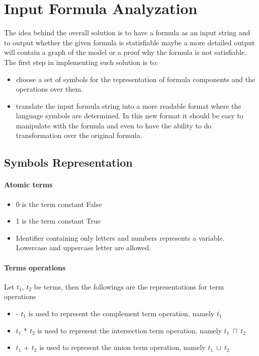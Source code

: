 \documentclass{article}
\begin{document}
	\section{Input Formula Analyzation}
		The idea behind the overall solution is to have a formula as an input string and to output whether the given formula is statisfiable maybe a more detailed output 
		will contain a graph of the model or a proof why the formula is not satisfiable.
		The first step in implementing such solution is to:
		\begin{itemize}
			\item choose a set of symbols for the representation of formula components and the operations over them.
			\item translate the input formula string into a more readable format where the language symbols are determined. In this new format 
				it should be easy to manipulate with the formula and even to have the ability to do transformation over the original formula.
		\end{itemize}

	\subsection{Symbols Representation}
		\paragraph{Atomic terms}
		\begin{itemize}
			\item 0 is the term constant False
			\item 1 is the term constant True
			\item Identifier containing only letters and numbers represents a variable. Lowercase and uppercase letter are allowed.
		\end{itemize}
		
		\paragraph{Terms operations}
		Let $t_1$, $t_2$ be terms, then the followings are the representations for term operations
		\begin{itemize}
			\item - $t_1$ is used to represent the complement term operation, namely $\overline{t_1}$
			\item $t_1$ * $t_2$ is used to represent the intersection term operation, namely $t_1 \: \sqcap \: t_2$
			\item $t_1$ + $t_2$ is used to represent the union term operation, namely $t_1 \: \sqcup \: t_2$
		\end{itemize}
		
\end{document}
